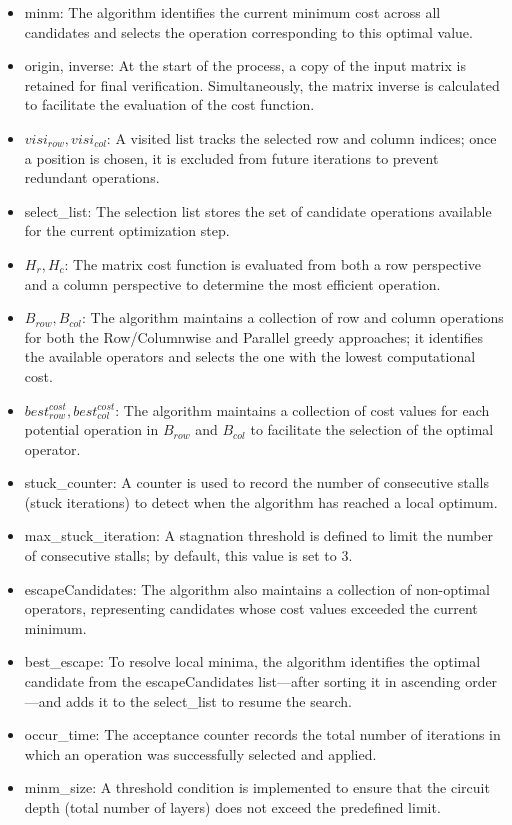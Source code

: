 \begin{itemize}
\item minm: The algorithm identifies the current minimum cost across all candidates and selects the operation corresponding to this optimal value.
\item origin, inverse: At the start of the process, a copy of the input matrix is retained for final verification. Simultaneously, the matrix inverse is calculated to facilitate the evaluation of the cost function.
\item $visi_{row}, visi_{col}$: A visited list tracks the selected row and column indices; once a position is chosen, it is excluded from future iterations to prevent redundant operations.
\item select\_list: The selection list stores the set of candidate operations available for the current optimization step.
\item $H_{r}, H_{c}$: The matrix cost function is evaluated from both a row perspective and a column perspective to determine the most efficient operation.
\item $B_{row}, B_{col}$: The algorithm maintains a collection of row and column operations for both the Row/Column\-wise and Parallel greedy approaches; it identifies the available operators and selects the one with the lowest computational cost.
\item $best_{row}^{cost}, best_{col}^{cost}$: The algorithm maintains a collection of cost values for each potential operation in $B_{row}$ and $B_{col}$ to facilitate the selection of the optimal operator.
\item stuck\_counter: A counter is used to record the number of consecutive stalls (stuck iterations) to detect when the algorithm has reached a local optimum.
\item max\_stuck\_iteration: A stagnation threshold is defined to limit the number of consecutive stalls; by default, this value is set to 3.
\item escapeCandidates: The algorithm also maintains a collection of non-optimal operators, representing candidates whose cost values exceeded the current minimum.
\item best\_escape: To resolve local minima, the algorithm identifies the optimal candidate from the escapeCandidates list—after sorting it in ascending order—and adds it to the select\_list to resume the search.
\item occur\_time: The acceptance counter records the total number of iterations in which an operation was successfully selected and applied.
\item minm\_size: A threshold condition is implemented to ensure that the circuit depth (total number of layers) does not exceed the predefined limit.

\end{itemize}
